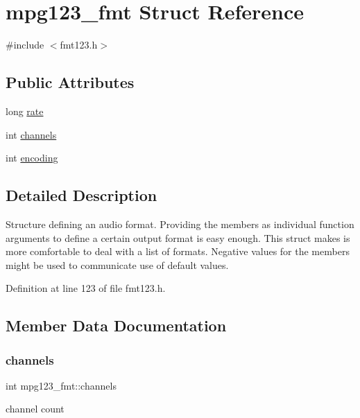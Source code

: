 \hypertarget{structmpg123__fmt}{}\section{mpg123\+\_\+fmt Struct Reference}
\label{structmpg123__fmt}


{\ttfamily \#include $<$fmt123.\+h$>$}

\subsection*{Public Attributes}
\begin{DoxyCompactItemize}
\item 
long \mbox{\hyperlink{structmpg123__fmt_ac28086d4f9023626dbbf2ba6601a108e}{rate}}
\item 
int \mbox{\hyperlink{structmpg123__fmt_a01661ec41c254e387a17c90f0e61df91}{channels}}
\item 
int \mbox{\hyperlink{structmpg123__fmt_a7c9ec01e750a071c97cea442617e802e}{encoding}}
\end{DoxyCompactItemize}


\subsection{Detailed Description}
Structure defining an audio format. Providing the members as individual function arguments to define a certain output format is easy enough. This struct makes is more comfortable to deal with a list of formats. Negative values for the members might be used to communicate use of default values. 

Definition at line 123 of file fmt123.\+h.



\subsection{Member Data Documentation}
\mbox{\label{structmpg123__fmt_a01661ec41c254e387a17c90f0e61df91}} 
\subsubsection{\texorpdfstring{channels}{channels}}
{\footnotesize\ttfamily int mpg123\+\_\+fmt\+::channels}

channel count 

